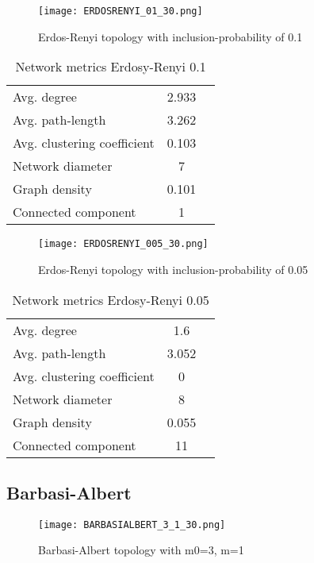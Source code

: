 \documentclass[Bachelorarbeit.tex]{subfiles}
\begin{document}
\begin{figure}[H]
	\centering
  \texttt{[image: ERDOSRENYI\_01\_30.png]}
	\caption{Erdos-Renyi topology with inclusion-probability of 0.1}
	\label{fig:topology_ERDOSRENYI_01_30}
\end{figure}

\begin{table}[h]
	\centering
	\caption{Network metrics Erdosy-Renyi 0.1}
	\begin{tabular} { l c r }
		\hline
		Avg. degree & 2.933 \\
		Avg. path-length & 3.262 \\
		Avg. clustering coefficient & 0.103 \\
		Network diameter & 7 \\
		Graph density & 0.101 \\
		Connected component & 1 \\
		\hline
	\end{tabular}
\end{table}


\begin{figure}[H]
	\centering
  \texttt{[image: ERDOSRENYI\_005\_30.png]}
	\caption{Erdos-Renyi topology with inclusion-probability of 0.05}
	\label{fig:topology_ERDOSRENYI_005_30}
\end{figure}

\begin{table}[h]
	\centering
	\caption{Network metrics Erdosy-Renyi 0.05}
	\begin{tabular} { l c r }
		\hline
		Avg. degree & 1.6 \\
		Avg. path-length & 3.052 \\
		Avg. clustering coefficient & 0 \\
		Network diameter & 8 \\
		Graph density & 0.055 \\
		Connected component & 11 \\
		\hline
	\end{tabular}
\end{table}

\subsection{Barbasi-Albert}
\begin{figure}[H]
	\centering
  \texttt{[image: BARBASIALBERT\_3\_1\_30.png]}
	\caption{Barbasi-Albert topology with m0=3, m=1}
	\label{fig:topology_BARBASIALBERT_3_1_30}
\end{figure}
\end{document}
